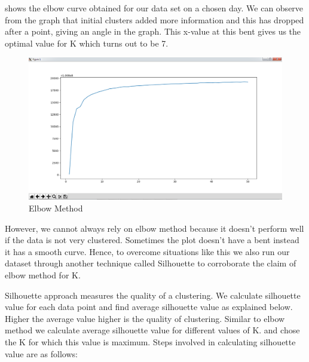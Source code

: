    shows the elbow curve obtained for our data set on a chosen day. We can observe from the graph that initial clusters added more information and this has dropped after a point, giving an angle in the graph. This x-value at this bent gives us the optimal value for K which turns out to be 7.
 	

\begin{figure}[b]
	\centerline{\includegraphics[scale = 0.4]{elbow.png}}
	\caption{Elbow Method}%
\end{figure}

 However, we cannot always rely on elbow method because it doesn't perform well if the data is not very clustered. Sometimes the plot doesn't have a bent instead it has a smooth curve. Hence, to overcome situations like this we also run our dataset through another technique called Silhouette to corroborate the claim of elbow method for K.
 
 Silhouette approach measures the quality of a clustering. We calculate silhouette value for each data point and find average silhouette value as explained below. Higher the average value higher is the quality of clustering. Similar to elbow method we calculate average silhouette value for different values of K. and chose the K for which this value is maximum. Steps involved in calculating silhouette value are as follows:
 	
